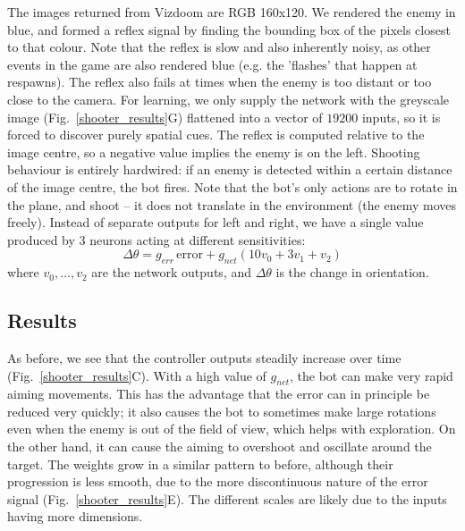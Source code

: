\documentclass{aamas2018}
\begin{document}
The images returned from Vizdoom are RGB 160x120. We rendered the
enemy in blue, and formed a reflex signal by finding the bounding box
of the pixels closest to that colour. Note that the reflex is slow and
also inherently noisy, as other events in the game are also rendered
blue (e.g. the 'flashes' that happen at respawns). The reflex also
fails at times when the enemy is too distant or too close to the
camera. For learning, we only supply the network with the greyscale
image (Fig.~\ref{shooter_results}G) flattened into a vector of $19200$
inputs, so it is forced to discover purely spatial cues. The reflex is
computed relative to the image centre, so a negative value implies the
enemy is on the left. Shooting behaviour is entirely hardwired: if an
enemy is detected within a certain distance of the image centre, the bot
fires. Note that the bot's only actions are to rotate in the plane,
and shoot -- it does not translate in the environment (the enemy moves freely). Instead of
separate outputs for left and right, we have a single value produced
by 3 neurons acting at different sensitivities:
\begin{equation}
\Delta \theta = g_{err}\, \mathrm{error} + g_{net} \left( 10 v_0 + 3 v_1 + v_2 \right)
\end{equation}
where $v_0, \ldots, v_2$ are the network outputs, and $\Delta \theta$
is the change in orientation.


\subsection{Results}
As before, we see that the controller outputs steadily increase over
time (Fig.~\ref{shooter_results}C). With a high value of $g_{net}$,
the bot can make very rapid aiming movements. This has the advantage
that the error can in principle be reduced very quickly; it also
causes the bot to sometimes make large rotations even when the enemy
is out of the field of view, which helps with exploration. On the
other hand, it can cause the aiming to overshoot and oscillate around
the target.  The weights grow in a similar pattern to before, although
their progression is less smooth, due to the more discontinuous nature
of the error signal (Fig.~\ref{shooter_results}E). The different
scales are likely due to the inputs having more dimensions.
\end{document}
